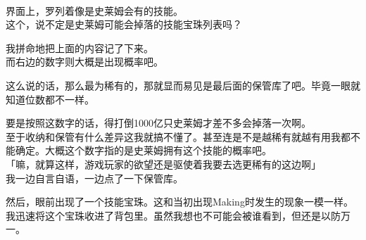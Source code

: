 \cardline\\

界面上，罗列着像是史莱姆会有的技能。\\

这个，说不定是史莱姆可能会掉落的技能宝珠列表吗？

我拼命地把上面的内容记了下来。\\

而右边的数字则大概是出现概率吧。

这么说的话，那么最为稀有的，那就显而易见是最后面的保管库了吧。毕竟一眼就知道位数都不一样。

要是按照这数字的话，得打倒1000亿只史莱姆才差不多会掉落一次啊。\\

至于收纳和保管有什么差异这我就搞不懂了。甚至连是不是越稀有就越有用我都不能确定。大概这个数字指的是史莱姆拥有这个技能的概率吧。\\

「嘛，就算这样，游戏玩家的欲望还是驱使着我要去选更稀有的这边啊」\\

我一边自言自语，一边点了一下保管库。

然后，眼前出现了一个技能宝珠。这和当初出现Making时发生的现象一模一样。\\

我迅速将这个宝珠收进了背包里。虽然我想也不可能会被谁看到，但还是以防万一。\\

